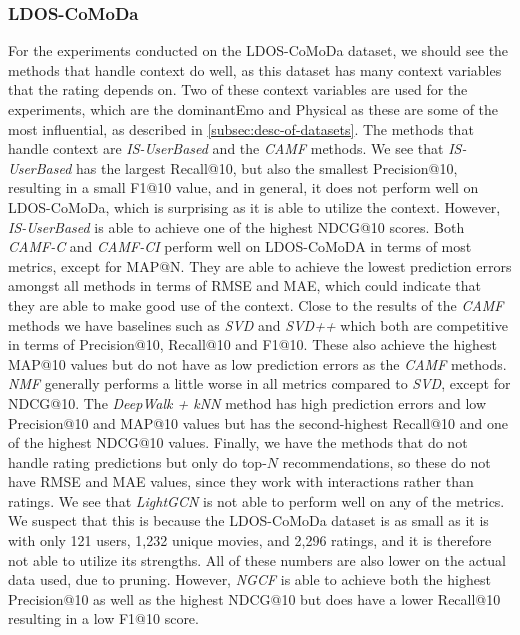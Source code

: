 \subsubsection{LDOS-CoMoDa}
For the experiments conducted on the LDOS-CoMoDa dataset, we should see the methods that handle context do well, as this dataset has many context variables that the rating depends on.
Two of these context variables are used for the experiments, which are the dominantEmo and Physical as these are some of the most influential, as described in \autoref{subsec:desc-of-datasets}.
The methods that handle context are \textit{IS-UserBased} and the \textit{CAMF} methods.
We see that \textit{IS-UserBased} has the largest Recall@10, but also the smallest Precision@10, resulting in a small F1@10 value, and in general, it does not perform well on LDOS-CoMoDa, which is surprising as it is able to utilize the context.
However, \textit{IS-UserBased} is able to achieve one of the highest NDCG@10 scores.
Both \textit{CAMF-C} and \textit{CAMF-CI} perform well on LDOS-CoMoDA in terms of most metrics, except for MAP@N.
They are able to achieve the lowest prediction errors amongst all methods in terms of RMSE and MAE, which could indicate that they are able to make good use of the context.
Close to the results of the \textit{CAMF} methods we have baselines such as \textit{SVD} and \textit{SVD++} which both are competitive in terms of Precision@10, Recall@10 and F1@10. 
These also achieve the highest MAP@10 values but do not have as low prediction errors as the \textit{CAMF} methods.
\textit{NMF} generally performs a little worse in all metrics compared to \textit{SVD}, except for NDCG@10.
The \textit{DeepWalk + kNN} method has high prediction errors and low Precision@10 and MAP@10 values but has the second-highest Recall@10 and one of the highest NDCG@10 values.
Finally, we have the methods that do not handle rating predictions but only do top-$N$ recommendations, so these do not have RMSE and MAE values, since they work with interactions rather than ratings.
We see that \textit{LightGCN} is not able to perform well on any of the metrics.
We suspect that this is because the LDOS-CoMoDa dataset is as small as it is with only 121 users, 1,232 unique movies, and 2,296 ratings, and it is therefore not able to utilize its strengths.
All of these numbers are also lower on the actual data used, due to pruning.
However, \textit{NGCF} is able to achieve both the highest Precision@10 as well as the highest NDCG@10 but does have a lower Recall@10 resulting in a low F1@10 score.
\\\\
